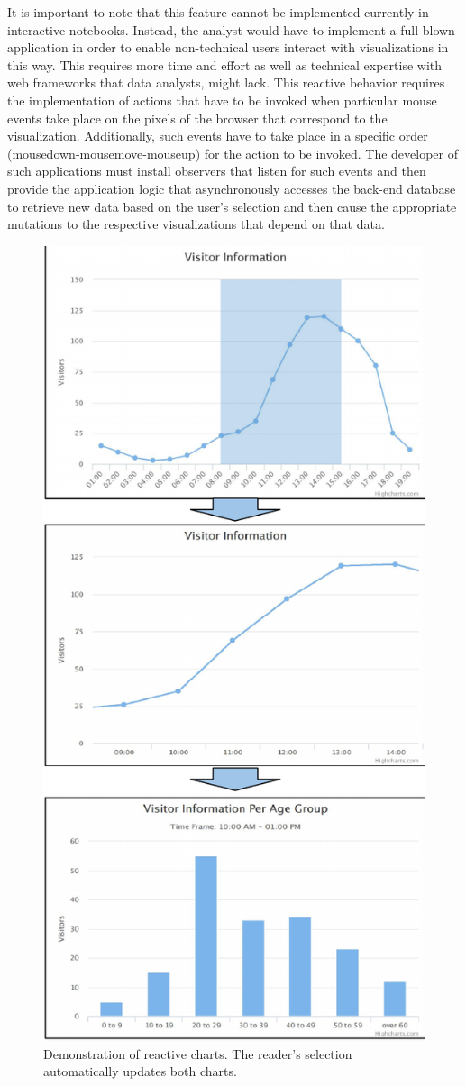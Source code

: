 It is important to note that this feature cannot be implemented currently in interactive notebooks. Instead, the analyst would have to implement a full blown application in order to enable non-technical users interact with visualizations in this way. This requires more time and effort as well as technical expertise with web frameworks that data analysts, might lack. This reactive behavior requires the implementation of actions that have to be invoked when particular mouse events take place on the pixels of the browser that correspond to the visualization. Additionally, such events have to take place in a specific order (mousedown-mousemove-mouseup) for the action to be invoked. The developer of such applications must install observers that listen for such events and then provide the application logic that asynchronously accesses the back-end database to retrieve new data based on the user's selection and then cause the appropriate mutations to the respective visualizations that depend on that data. 
\begin{figure}[]
\centering
	\includegraphics[width=0.7\columnwidth]{figures/reactive-processing.pdf}
	\caption{Demonstration of reactive charts. The reader's selection automatically updates both charts.}
	\label{fig:reactive-data-processing}
\end{figure}

